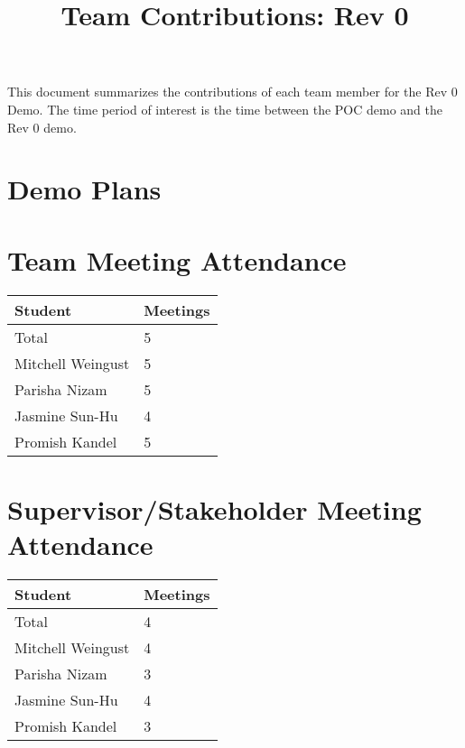 \documentclass{article}
\title{Team Contributions: Rev 0\\\progname}
\author{\authname}
\date{}
\begin{document}
\maketitle

This document summarizes the contributions of each team member for the Rev 0
Demo.  The time period of interest is the time between the POC demo and the Rev
0 demo.

\section{Demo Plans}


\section{Team Meeting Attendance}

\begin{table}[H]
\centering
\begin{tabular}{ll}
\toprule
\textbf{Student} & \textbf{Meetings}\\
\midrule
Total & 5\\
Mitchell Weingust & 5\\
Parisha Nizam & 5\\
Jasmine Sun-Hu & 4\\
Promish Kandel & 5\\
\bottomrule
\end{tabular}
\end{table}


\section{Supervisor/Stakeholder Meeting Attendance}

\begin{table}[H]
\centering
\begin{tabular}{ll}
\toprule
\textbf{Student} & \textbf{Meetings}\\
\midrule
Total & 4\\
Mitchell Weingust & 4\\
Parisha Nizam & 3\\
Jasmine Sun-Hu & 4\\
Promish Kandel & 3\\
\bottomrule
\end{tabular}
\end{table}
\end{document}
